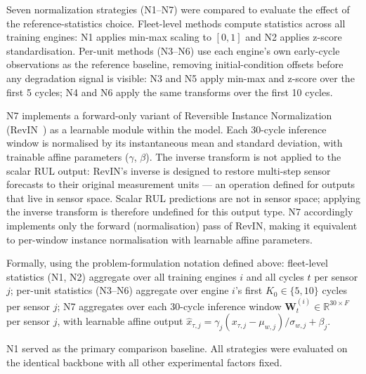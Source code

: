 \documentclass[preprint,10pt]{elsarticle}
\begin{document}
Seven normalization strategies (N1--N7) were compared to evaluate the effect of the reference-statistics choice. Fleet-level methods compute statistics across all training engines: N1 applies min-max scaling to $[0,1]$ and N2 applies z-score standardisation. Per-unit methods (N3--N6) use each engine's own early-cycle observations as the reference baseline, removing initial-condition offsets before any degradation signal is visible: N3 and N5 apply min-max and z-score over the first 5 cycles; N4 and N6 apply the same transforms over the first 10 cycles.

N7 implements a forward-only variant of Reversible Instance Normalization (RevIN~\cite{ref23}) as a learnable module within the model. Each 30-cycle inference window is normalised by its instantaneous mean and standard deviation, with trainable affine parameters ($\gamma$, $\beta$). The inverse transform is not applied to the scalar RUL output: RevIN's inverse is designed to restore multi-step sensor forecasts to their original measurement units --- an operation defined for outputs that live in sensor space. Scalar RUL predictions are not in sensor space; applying the inverse transform is therefore undefined for this output type. N7 accordingly implements only the forward (normalisation) pass of RevIN, making it equivalent to per-window instance normalisation with learnable affine parameters.

Formally, using the problem-formulation notation defined above: fleet-level statistics (N1, N2) aggregate over all training engines $i$ and all cycles $t$ per sensor $j$; per-unit statistics (N3--N6) aggregate over engine $i$'s first $K_0 \in \{5, 10\}$ cycles per sensor $j$; N7 aggregates over each 30-cycle inference window $\mathbf{W}_t^{(i)} \in \mathbb{R}^{30 \times F}$ per sensor $j$, with learnable affine output $\hat{x}_{\tau,j} = \gamma_j(x_{\tau,j} - \mu_{w,j})/\sigma_{w,j} + \beta_j$.

N1 served as the primary comparison baseline. All strategies were evaluated on the identical backbone with all other experimental factors fixed.
\end{document}

